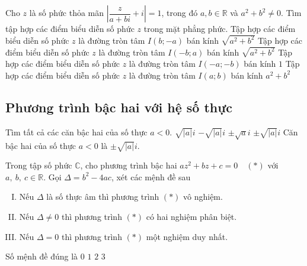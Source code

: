 \begin{ex}%
	Cho $ z $ là số phức thỏa mãn $ \left|\dfrac{z}{a+bi}+i\right|=1 $, trong đó $ a, b\in\mathbb{R} $ và $ a^2+b^2\neq 0 $. Tìm tập hợp các điểm biểu diễn số phức $ z $ trong mặt phẳng phức.	
	\choice
	{\True Tập hợp các điểm biểu diễn số phức $ z $ là đường tròn tâm $ I(b; -a) $ bán kính $ \sqrt{a^2+b^2} $}
	{Tập hợp các điểm biểu diễn số phức $ z $ là đường tròn tâm $ I(-b; a) $ bán kính $ \sqrt{a^2+b^2} $}
	{Tập hợp các điểm biểu diễn số phức $ z $ là đường tròn tâm $ I(-a; -b) $ bán kính $ 1 $}
	{Tập hợp các điểm biểu diễn số phức $ z $ là đường tròn tâm $ I(a; b) $ bán kính $ a^2+b^2 $}
\end{ex}
\subsection {Phương trình bậc hai với hệ số thực}

\begin{ex}%
	Tìm tất cả các căn bậc hai của số thực $a<0$.
	\choice
	{$\sqrt{|a|}i$}
	{$-\sqrt{|a|}i$}
	{$\pm\sqrt{a}i$}
	{\True $\pm\sqrt{|a|}i$}
	\loigiai
	{
		Căn bậc hai của số thực $a<0$ là $\pm\sqrt{|a|}i$.
	}
\end{ex}

\begin{ex}%
	Trong tập số phức $ \mathbb{C} $, cho phương trình bậc hai $ az^2+bz+c=0 \quad(*)$ với $ a,~b,~c \in \mathbb{R} $. Gọi $ \Delta=b^2-4ac $, xét các mệnh đề sau
	\begin{enumerate}[(I)]
		\item Nếu $ \Delta $ là số thực âm thì phương trình $ (*) $ vô nghiệm.
		\item Nếu $ \Delta \ne 0$ thì phương trình $ (*) $ có hai nghiệm phân biệt.
		\item  Nếu $ \Delta=0 $ thì phương trình $ (*) $ một nghiệm duy nhất. 
	\end{enumerate}
	Số mệnh đề đúng là
	\choice
	{$ 0 $}
	{$ 1 $}
	{\True $ 2 $}
	{$ 3 $}
\end{ex}

